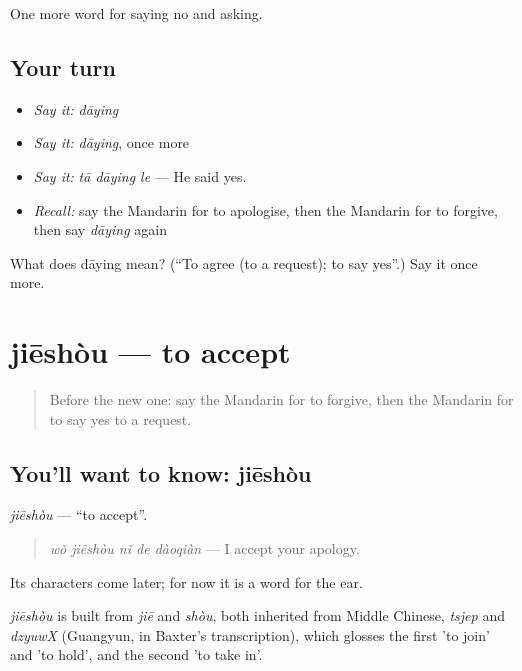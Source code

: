 \begin{grammarlens}[title={What you've built}]
One more word for saying no and asking.
\end{grammarlens}

\subsection*{Your turn}
\begin{itemize}
\raggedright
  \item \emph{Say it:} \emph{dāying}
  \item \emph{Say it:} \emph{dāying}, once more
  \item \emph{Say it:} \emph{tā dāying le} — He said yes.
  \item \emph{Recall:} say the Mandarin for to apologise, then the Mandarin for to forgive, then say \emph{dāying} again
\end{itemize}

\begin{tcolorbox}[breakable,colback=teal!4,colframe=teal!35!black,title={Before you move on}]
What does dāying mean? (\textquotedblleft{}To agree (to a request); to say yes\textquotedblright{}.) Say it once more.
\end{tcolorbox}
\section[jiēshòu]{jiēshòu — to accept}

\label{lesson:ZH-C275-jieshou}



\begin{quote}
Before the new one: say the Mandarin for to forgive, then the Mandarin for to say yes to a request.
\end{quote}

\subsection*{You'll want to know: jiēshòu}
\emph{jiēshòu} — \textquotedblleft{}to accept\textquotedblright{}.

\begin{quote}
\emph{wǒ jiēshòu nǐ de dàoqiàn} — I accept your apology.
\end{quote}

Its characters come later; for now it is a word for the ear.

\begin{cousinweb}
\emph{jiēshòu} is built from \emph{jiē} and \emph{shòu}, both inherited from Middle Chinese, \emph{tsjep} and \emph{dzyuwX} (Guangyun, in Baxter's transcription), which glosses the first 'to join' and 'to hold', and the second 'to take in'.
\end{cousinweb}

